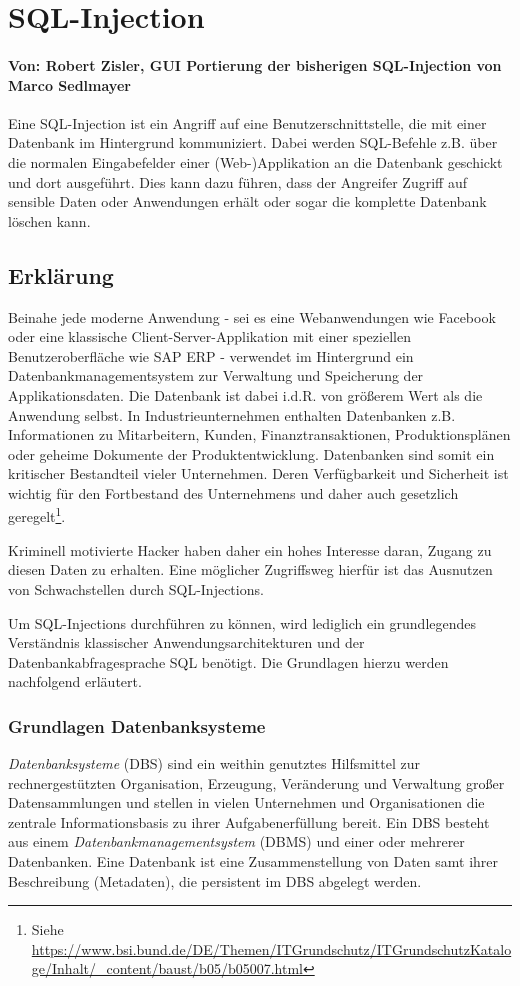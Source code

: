 \chapter{SQL-Injection}
\subsubsection*{Von: Robert Zisler, GUI Portierung der bisherigen SQL-Injection von Marco Sedlmayer}

Eine SQL-Injection ist ein Angriff auf eine Benutzerschnittstelle, die mit einer Datenbank im Hintergrund kommuniziert. Dabei werden SQL-Befehle z.B. über die normalen Eingabefelder einer (Web-)Applikation an die Datenbank geschickt und dort ausgeführt. Dies kann dazu führen, dass der Angreifer Zugriff auf sensible Daten oder Anwendungen erhält oder sogar die komplette Datenbank löschen kann. 

\section{Erklärung}
Beinahe jede moderne Anwendung - sei es eine Webanwendungen wie Facebook oder eine klassische Client-Server-Applikation mit einer speziellen Benutzeroberfläche wie SAP ERP - verwendet im Hintergrund ein Datenbankmanagementsystem zur Verwaltung und Speicherung der Applikationsdaten. Die Datenbank ist dabei i.d.R. von größerem Wert als die Anwendung selbst. In Industrieunternehmen enthalten Datenbanken z.B. Informationen zu Mitarbeitern, Kunden, Finanztransaktionen, Produktionsplänen oder geheime Dokumente der Produktentwicklung. Datenbanken sind somit ein kritischer Bestandteil vieler Unternehmen. Deren Verfügbarkeit und Sicherheit ist wichtig für den Fortbestand des Unternehmens und daher auch gesetzlich geregelt\footnote{Siehe \url{https://www.bsi.bund.de/DE/Themen/ITGrundschutz/ITGrundschutzKataloge/Inhalt/_content/baust/b05/b05007.html} }.

Kriminell motivierte Hacker haben daher ein hohes Interesse daran, Zugang zu diesen Daten zu erhalten. Eine möglicher Zugriffsweg hierfür ist das Ausnutzen von Schwachstellen durch SQL-Injections.

Um SQL-Injections durchführen zu können, wird lediglich ein grundlegendes Verständnis klassischer Anwendungsarchitekturen und der Datenbankabfragesprache SQL benötigt. Die Grundlagen hierzu werden nachfolgend erläutert.

\subsection{Grundlagen Datenbanksysteme}
\emph{Datenbanksysteme} (DBS) sind ein weithin genutztes Hilfsmittel zur rechnergestützten Organisation, Erzeugung, Veränderung und Verwaltung großer Datensammlungen und stellen in vielen Unternehmen und Organisationen die zentrale Informationsbasis zu ihrer Aufgabenerfüllung bereit. Ein DBS besteht aus einem \emph{Datenbankmanagementsystem} (DBMS) und einer oder mehrerer Datenbanken. Eine Datenbank ist eine Zusammenstellung von Daten samt ihrer Beschreibung (Metadaten), die persistent im DBS abgelegt werden.

